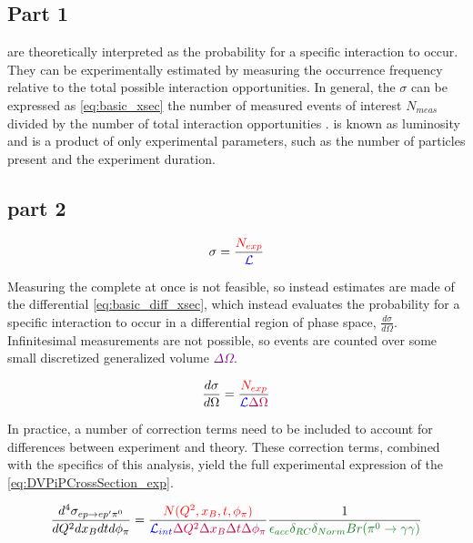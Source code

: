 \subsection{Part 1}
\Xsecs are theoretically interpreted as  the probability for a specific interaction to occur. They can be experimentally estimated by measuring the occurrence frequency relative to the total possible interaction opportunities. In general, the \xsec $\sigma$ can be expressed as \eqref{eq:basic_xsec} the number of measured events of interest $N_{meas}$ divided by the number of total interaction opportunities \Lumi. \Lumi is known as luminosity and is a product of only experimental parameters, such as the number of particles present and the experiment duration. 

\subsection{part 2}


\begin{equation} \label{eq:basic_xsec}
    \sigma = \frac{\textcolor{red}{N_{exp}}}{\textcolor{blue}{ \mathcal{L}}}
\end{equation}

Measuring the complete \xsec at once is not feasible, so instead estimates are made of the differential \xsec \eqref{eq:basic_diff_xsec}, which instead evaluates the probability for a specific interaction to occur in a differential region of phase space, $\frac{d\sigma}{d\Omega}$. Infinitesimal measurements are not possible, so events are counted over some small discretized generalized volume \textcolor{purple}{$\Delta \Omega$}. 

\begin{equation} \label{eq:basic_diff_xsec}
    \frac{d\sigma}{d\Omega} = \frac{ \textcolor{red}{N_{exp}}} {\textcolor{blue}{ \mathcal{L}} \textcolor{purple}{\Delta \Omega}}
\end{equation}

In practice, a number of correction terms need to be included to account for differences between experiment and theory. These correction terms, combined with the specifics of this analysis, yield the full experimental expression of the \xsec \eqref{eq:DVPiPCrossSection_exp}. 

     \begin{equation}\labelAndRemember{eq:DVPiPCrossSection_exp}
           { \frac{    d^4\sigma_{  ep \rightarrow ep'\pi^0}   } {dQ^2dx_Bdtd\phi_{\pi}} 
                =   \frac{ \textcolor{red}{ N(Q^2,x_B,t,\phi_{\pi})}} {\Lumiint \textcolor{purple}{ \Delta Q^2 \Delta x_B \Delta t \Delta \phi_{\pi}}} 
                \frac{1}{\textcolor{correctionfactors}{\epsilon_{acc} \delta_{RC} \delta_{Norm} Br(\pi^0\rightarrow\gamma\gamma)}}}
     \end{equation}      

